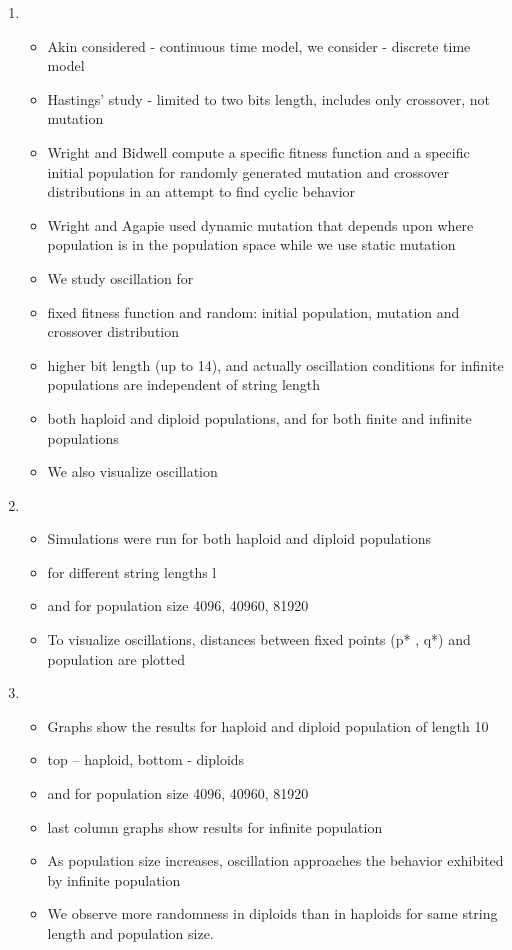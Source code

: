 \documentclass{article}
\begin{document}
\begin{enumerate}
    
\item
  \begin{itemize}
  \item Akin considered - continuous time model, we consider -
    discrete time model
   \item Hastings' study - limited to two bits length, includes only
     crossover, not mutation
  \item Wright and Bidwell compute a specific fitness function and a
    specific initial population for randomly generated mutation and
    crossover distributions in an attempt to find cyclic behavior
  \item Wright and Agapie used dynamic mutation that depends upon
    where population is in the population space while we use static
    mutation
  \item We study oscillation for
  \item fixed fitness function and random: initial population,
    mutation and crossover distribution
  \item higher bit length (up to 14), and actually oscillation
    conditions for infinite populations are independent of string
    length
  \item both haploid and diploid populations, and for both finite and
    infinite populations
  \item We also visualize oscillation
  \end{itemize}

\item
  \begin{itemize}
  \item Simulations were run for both haploid and diploid populations
  \item for different string lengths l
  \item and for population size {4096, 40960, 81920}
  \item To visualize oscillations, distances between fixed points (p*
    , q*) and population are plotted
  \end{itemize}
    
\item
  \begin{itemize}
  \item Graphs show the results for haploid and diploid population of
    length 10
   \item top – haploid, bottom - diploids
  \item and for population size {4096, 40960, 81920}
  \item last column graphs show results for infinite population
  \item As population size increases, oscillation approaches the
    behavior exhibited by infinite population
  \item We observe more randomness in diploids than in haploids for
    same string length and population size.
  \end{itemize}
    

\end{enumerate}
\end{document}
